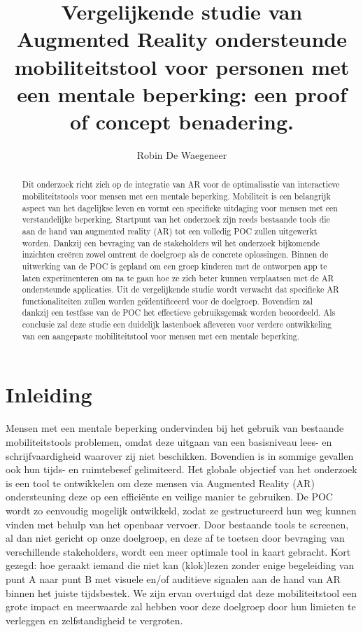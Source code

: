 \documentclass{hogent-article}
\title{Vergelijkende studie van Augmented Reality ondersteunde mobiliteitstool voor personen met een mentale beperking: een proof of concept benadering.}
\author{Robin De Waegeneer}
\begin{document}
  \begin{abstract}
    Dit onderzoek richt zich op de integratie van AR voor de optimalisatie van interactieve mobiliteitstools voor mensen met een mentale beperking. Mobiliteit is een belangrijk aspect van het dagelijkse leven en vormt een specifieke uitdaging voor mensen met een verstandelijke beperking. Startpunt van het onderzoek zijn reeds bestaande tools die aan de hand van augmented reality (AR) tot een volledig POC zullen uitgewerkt worden. Dankzij een bevraging van de stakeholders wil het onderzoek bijkomende inzichten creëren zowel omtrent de doelgroep als de concrete oplossingen. Binnen de uitwerking van de POC is gepland om een groep kinderen met de ontworpen app te laten experimenteren om na te gaan hoe ze zich beter kunnen verplaatsen met de AR ondersteunde applicaties. Uit de vergelijkende studie wordt verwacht dat specifieke AR functionaliteiten zullen worden geïdentificeerd voor de doelgroep. Bovendien zal dankzij een testfase van de POC het effectieve gebruiksgemak worden beoordeeld. Als conclusie zal deze studie een duidelijk lastenboek afleveren voor verdere ontwikkeling van een aangepaste mobiliteitstool voor mensen met een mentale beperking.
  \end{abstract}

\tableofcontents

\bigskip

\section{Inleiding}%
    \label{sec:inleiding}
    
    Mensen met een mentale beperking ondervinden bij het gebruik van bestaande mobiliteitstools problemen, omdat deze uitgaan van een basisniveau lees- en schrijfvaardigheid waarover zij niet beschikken. Bovendien is in sommige gevallen ook hun tijds- en ruimtebesef gelimiteerd. Het globale objectief van het onderzoek is een tool te ontwikkelen om deze mensen via  Augmented Reality (AR) ondersteuning deze op een efficiënte en veilige manier te gebruiken. De POC wordt zo eenvoudig mogelijk ontwikkeld, zodat ze gestructureerd hun weg kunnen vinden met behulp van het openbaar vervoer. Door bestaande tools te screenen, al dan niet gericht op onze doelgroep, en deze af te toetsen door bevraging van verschillende stakeholders, wordt een meer optimale tool in kaart gebracht. Kort gezegd: hoe geraakt iemand die niet kan (klok)lezen zonder enige begeleiding van punt A naar punt B met visuele en/of auditieve signalen aan de hand van AR binnen het juiste tijdsbestek.
    We zijn ervan overtuigd dat deze mobiliteitstool een grote impact en meerwaarde zal hebben voor deze doelgroep door hun limieten te verleggen en zelfstandigheid te vergroten.
    
\end{document}
